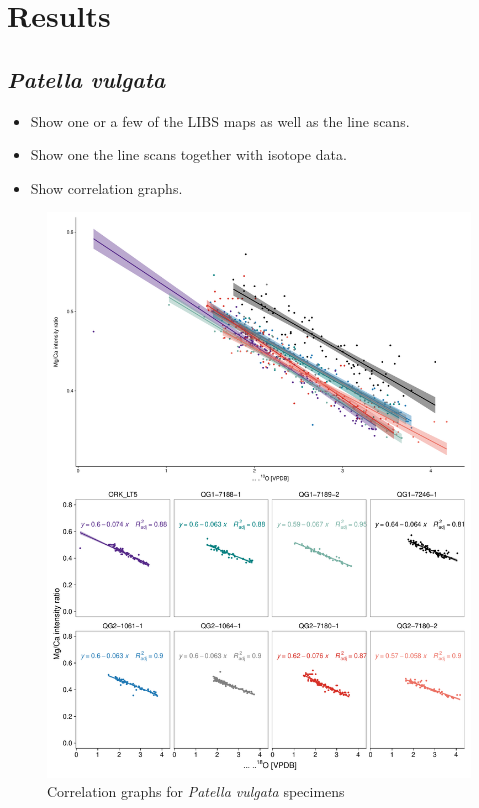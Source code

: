 \documentclass[
  authoryear,
  preprint,
  3p]{elsarticle}
\providecommand{\tightlist}{%
  \setlength{\itemsep}{0pt}\setlength{\parskip}{0pt}}\usepackage{longtable,booktabs,array}
\begin{document}
\section{Results}\label{Results}

\subsection{\texorpdfstring{\emph{Patella
vulgata}}{Patella vulgata}}\label{patella-vulgata}

\begin{itemize}
\tightlist
\item
  Show one or a few of the LIBS maps as well as the line scans.
\item
  Show one the line scans together with isotope data.
\item
  Show correlation graphs.
\end{itemize}

\begin{figure}[H]

{\centering \includegraphics{Manuscript_files/figure-pdf/Patella_Correlation_Graphs-1.pdf}

}

\caption{Correlation graphs for \emph{Patella vulgata} specimens}

\end{figure}%
\end{document}
